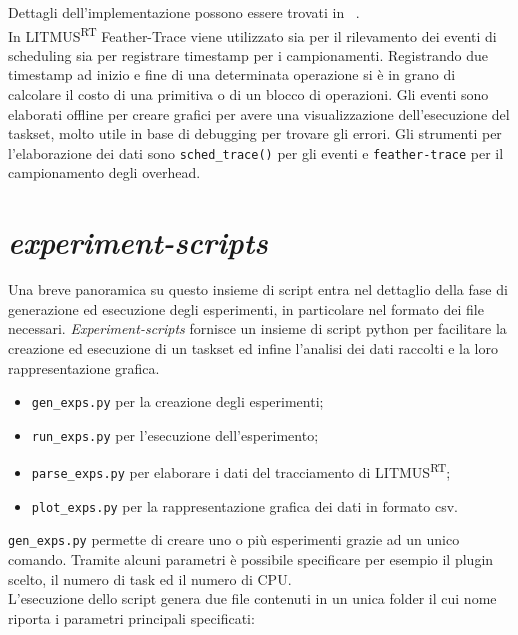 \begin{appendices}
Dettagli dell'implementazione possono essere trovati in ~\cite{Brandenburg07feather-trace:a}.\\

In LITMUS\textsuperscript{RT} Feather-Trace viene utilizzato sia per il rilevamento dei eventi di scheduling sia per registrare timestamp per i campionamenti. Registrando due timestamp ad inizio e fine di una determinata operazione si è in grano di calcolare il costo di una primitiva o di un blocco di operazioni. Gli eventi sono elaborati offline per creare grafici per avere una visualizzazione dell'esecuzione del taskset, molto utile in base di debugging per trovare gli errori. Gli strumenti per l'elaborazione dei dati sono \texttt{sched\_trace()} per gli eventi e \texttt{feather-trace} per il campionamento degli overhead.\\

\chapter{\textit{experiment-scripts}}
\label{sec:exp-script}

Una breve panoramica su questo insieme di script entra nel dettaglio della fase di generazione ed esecuzione degli esperimenti, in particolare nel formato dei file necessari. \textit{Experiment-scripts} fornisce un insieme di script python per facilitare la creazione ed esecuzione di un taskset ed infine l'analisi dei dati raccolti e la loro rappresentazione grafica.\\

\begin{itemize}
	\item \texttt{gen\_exps.py} per la creazione degli esperimenti;
	\item \texttt{run\_exps.py} per l'esecuzione dell'esperimento;
	\item \texttt{parse\_exps.py} per elaborare i dati del tracciamento di LITMUS\textsuperscript{RT};
	\item \texttt{plot\_exps.py} per la rappresentazione grafica dei dati in formato csv.
\end{itemize}

\texttt{gen\_exps.py} permette di creare uno o più esperimenti grazie ad un unico comando. Tramite alcuni parametri è possibile specificare per esempio il plugin scelto, il numero di task ed il numero di CPU.\\

L'esecuzione dello script genera due file contenuti in un unica folder il cui nome riporta i parametri principali specificati:


\end{appendices}
